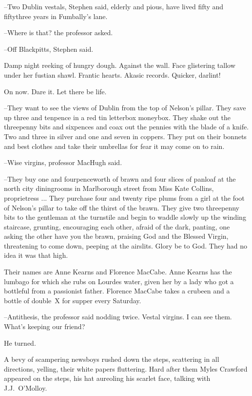 --Two Dublin vestals,
Stephen said,
elderly and pious,
have lived fifty and fiftythree years in Fumbally's lane.

--Where is that?
the professor asked.

--Off Blackpitts,
Stephen said.

Damp night reeking of hungry dough.
Against the wall.
Face glistering tallow under her fustian shawl.
Frantic hearts.
Akasic records.
Quicker, darlint!

On now.
Dare it.
Let there be life.

--They want to see the views of Dublin from the top of Nelson's pillar.
They save up three and tenpence in a red tin letterbox moneybox.
They shake out the threepenny bits and sixpences
and coax out the pennies with the blade of a knife.
Two and three in silver
and one and seven in coppers.
They put on their bonnets and best clothes
and take their umbrellas for fear it may come on to rain.

--Wise virgins,
professor MacHugh said.



--They buy one and fourpenceworth of brawn
and four slices of panloaf
at the north city diningrooms in Marlborough street
from Miss Kate Collins, proprietress ...
They purchase four and twenty ripe plums
from a girl at the foot of Nelson's pillar
to take off the thirst of the brawn.
They give two threepenny bits to the gentleman at the turnstile
and begin to waddle slowly up the winding staircase,
grunting,
encouraging each other,
afraid of the dark,
panting,
one asking the other
have you the brawn,
praising
God and the Blessed Virgin,
threatening to come down,
peeping at the airslits.
Glory be to God.
They had no idea it was that high.

Their names are Anne Kearns and Florence MacCabe.
Anne Kearns has the lumbago for which she rubs on Lourdes water,
given her by a lady
who got a bottleful from a passionist father.
Florence MacCabe takes a crubeen and a bottle of double~X for supper every Saturday.

--Antithesis,
the professor said nodding twice.
Vestal virgins.
I can see them.
What's keeping our friend?

He turned.

A bevy of scampering newsboys rushed down the steps,
scattering in all directions, yelling,
their white papers fluttering.
Hard after them Myles Crawford appeared on the steps,
his hat aureoling his scarlet face,
talking with J.J.~O'Molloy.

